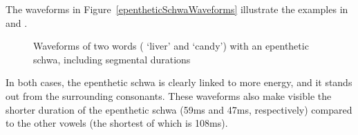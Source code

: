 The waveforms in Figure~\vref{epentheticSchwaWaveforms} illustrate the examples in   and . 
\begin{figure}[ht]
\caption[Waveforms of two words with an epenthetic schwa]{Waveforms of two words ( ‘liver’ and  ‘candy’) with an epenthetic schwa, including segmental durations}\label{epentheticSchwaWaveforms}
\end{figure}

In both cases, the epenthetic schwa is clearly linked to more energy, and it stands out from the surrounding consonants. %
These waveforms also make visible the shorter duration of the epenthetic schwa (59ms and 47ms, respectively) compared to the other vowels (the shortest of which is 108ms).


